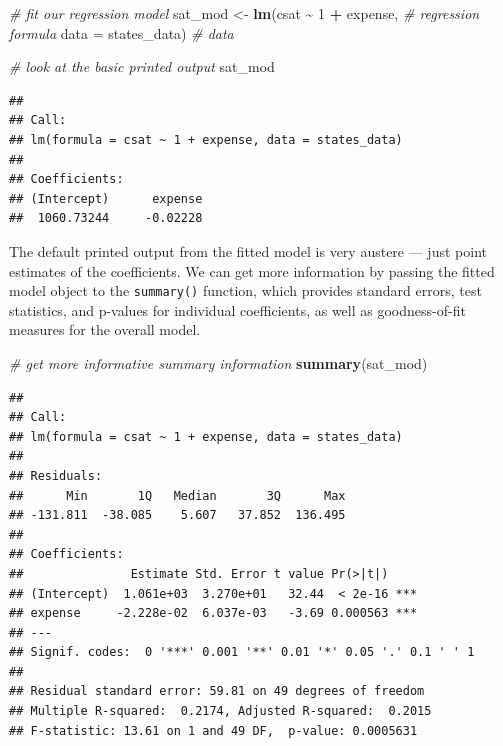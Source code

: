 \documentclass[
]{book}
\newenvironment{Shaded}{\begin{snugshade}}{\end{snugshade}}
\newcommand{\CommentTok}[1]{\textcolor[rgb]{0.56,0.35,0.01}{\textit{#1}}}
\newcommand{\DataTypeTok}[1]{\textcolor[rgb]{0.13,0.29,0.53}{#1}}
\newcommand{\DecValTok}[1]{\textcolor[rgb]{0.00,0.00,0.81}{#1}}
\newcommand{\KeywordTok}[1]{\textcolor[rgb]{0.13,0.29,0.53}{\textbf{#1}}}
\newcommand{\NormalTok}[1]{#1}
\newcommand{\OperatorTok}[1]{\textcolor[rgb]{0.81,0.36,0.00}{\textbf{#1}}}
\newcommand{\StringTok}[1]{\textcolor[rgb]{0.31,0.60,0.02}{#1}}
\begin{document}
\begin{Shaded}
\begin{Highlighting}[]
  \CommentTok{\# fit our regression model}
\NormalTok{  sat\_mod \textless{}{-}}\StringTok{ }\KeywordTok{lm}\NormalTok{(csat }\OperatorTok{\textasciitilde{}}\StringTok{ }\DecValTok{1} \OperatorTok{+}\StringTok{ }\NormalTok{expense, }\CommentTok{\# regression formula}
                \DataTypeTok{data =}\NormalTok{ states\_data) }\CommentTok{\# data }

  \CommentTok{\# look at the basic printed output}
\NormalTok{  sat\_mod}
\end{Highlighting}
\end{Shaded}

\begin{verbatim}
## 
## Call:
## lm(formula = csat ~ 1 + expense, data = states_data)
## 
## Coefficients:
## (Intercept)      expense  
##  1060.73244     -0.02228
\end{verbatim}

The default printed output from the fitted model is very austere --- just point estimates of the coefficients. We can get more information by passing the fitted model object to the \texttt{summary()} function, which provides standard errors, test statistics, and p-values for individual coefficients, as well as goodness-of-fit measures for the overall model.

\begin{Shaded}
\begin{Highlighting}[]
  \CommentTok{\# get more informative summary information }
  \KeywordTok{summary}\NormalTok{(sat\_mod)}
\end{Highlighting}
\end{Shaded}

\begin{verbatim}
## 
## Call:
## lm(formula = csat ~ 1 + expense, data = states_data)
## 
## Residuals:
##      Min       1Q   Median       3Q      Max 
## -131.811  -38.085    5.607   37.852  136.495 
## 
## Coefficients:
##               Estimate Std. Error t value Pr(>|t|)    
## (Intercept)  1.061e+03  3.270e+01   32.44  < 2e-16 ***
## expense     -2.228e-02  6.037e-03   -3.69 0.000563 ***
## ---
## Signif. codes:  0 '***' 0.001 '**' 0.01 '*' 0.05 '.' 0.1 ' ' 1
## 
## Residual standard error: 59.81 on 49 degrees of freedom
## Multiple R-squared:  0.2174, Adjusted R-squared:  0.2015 
## F-statistic: 13.61 on 1 and 49 DF,  p-value: 0.0005631
\end{verbatim}
\end{document}
